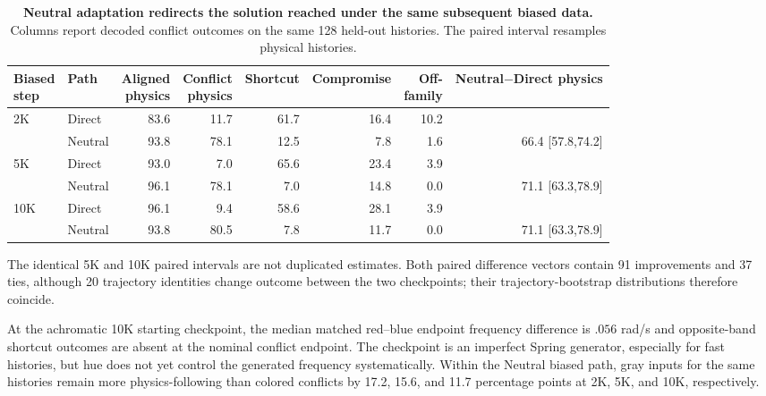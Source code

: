 \begin{table}[!htbp]
  \centering
  \caption{\textbf{Neutral adaptation redirects the solution reached under the
  same subsequent biased data.} Columns report decoded conflict outcomes on the
  same 128 held-out histories. The paired interval resamples physical histories.}
  \label{tab:pretrained-heldout}
  \setlength{\tabcolsep}{2pt}
  \begin{tabular}{llrrrrrr}
    \toprule
    \shortstack{Biased\\step} & Path & \shortstack{Aligned\\physics} & \shortstack{Conflict\\physics} & Shortcut & Compromise & \shortstack{Off-\\family} & \shortstack{Neutral$-$Direct\\physics} \\
    \midrule
    2K & Direct  & 83.6 & 11.7 & 61.7 & 16.4 & 10.2 & \\
       & Neutral & 93.8 & 78.1 & 12.5 & 7.8  & 1.6  & 66.4 [57.8,74.2] \\
    5K & Direct  & 93.0 & 7.0  & 65.6 & 23.4 & 3.9  & \\
       & Neutral & 96.1 & 78.1 & 7.0  & 14.8 & 0.0  & 71.1 [63.3,78.9] \\
    10K& Direct  & 96.1 & 9.4  & 58.6 & 28.1 & 3.9  & \\
       & Neutral & 93.8 & 80.5 & 7.8  & 11.7 & 0.0  & 71.1 [63.3,78.9] \\
    \bottomrule
  \end{tabular}
\end{table}

The identical 5K and 10K paired intervals are not duplicated estimates. Both
paired difference vectors contain 91 improvements and 37 ties, although 20
trajectory identities change outcome between the two checkpoints; their
trajectory-bootstrap distributions therefore coincide.

At the achromatic 10K starting checkpoint, the median matched red--blue
endpoint frequency difference is $.056$ rad/s and opposite-band shortcut
outcomes are absent at the nominal conflict endpoint. The checkpoint is an
imperfect Spring generator, especially for fast histories, but hue does not yet
control the generated frequency systematically. Within the Neutral biased path,
gray inputs for the same histories remain more physics-following than colored
conflicts by 17.2, 15.6, and 11.7 percentage points at 2K, 5K, and 10K,
respectively.

